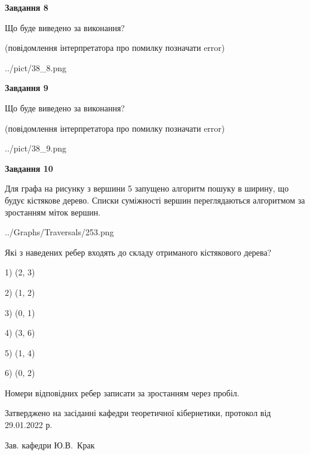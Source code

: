 \documentclass[12pt, ukrainian]{article}
\begin{document}
{\begin {large}
{\begin {center}\textbf{Завдання 8}\end {center}}\par
Що буде виведено за виконання?\par
 (повідомлення інтерпретатора про помилку позначати error)\par
\begin{center}
	{../pict/38_8.png}
\end{center}
\newpage

{\begin {center}\textbf{Завдання 9}\end {center}}\par
Що буде виведено за виконання?\par
 (повідомлення інтерпретатора про помилку позначати error)\par
\begin{center}
	{../pict/38_9.png}
\end{center}
\newpage

{\begin {center}\textbf{Завдання 10}\end {center}}\par
Для графа на рисунку з вершини 5 запущено алгоритм пошуку в ширину, що будує кістякове дерево. Списки суміжності вершин переглядаються алгоритмом за зростанням міток вершин.\par
\begin{center}
	{../Graphs/Traversals/253.png}
\end{center}
\par Які з наведених ребер входять до складу отриманого кістякового дерева?\par
1) (2, 3)\par
2) (1, 2)\par
3) (0, 1)\par
4) (3, 6)\par
5) (1, 4)\par
6) (0, 2)\par
{\vskip 15pt} Номери відповідних ребер записати за зростанням через пробіл.\par
\newpage


\end {large}
}
{\smallskip \begin {small} Затверджено на засіданні кафедри теоретичної кібернетики, протокол  від   29.01.2022 р.\par\smallskip\smallskip
{\parbox {6.5 cm}{Зав. кафедри \dotfill Ю.В.~Крак}} \end{small}}
\end{document}
